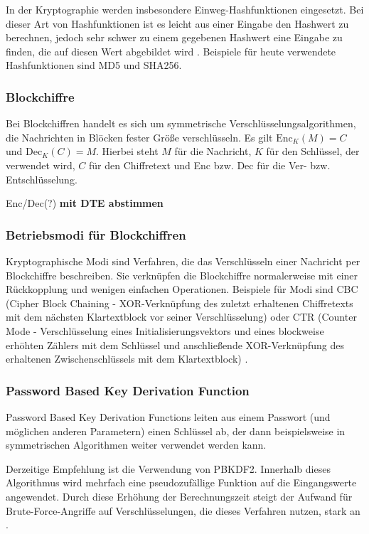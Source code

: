 In der Kryptographie werden insbesondere Einweg-Hashfunktionen eingesetzt. Bei dieser Art von Hashfunktionen ist es leicht aus einer Eingabe den Hashwert zu berechnen, jedoch sehr schwer zu einem gegebenen Hashwert eine Eingabe zu finden, die auf diesen Wert abgebildet wird \cite{Schneier2006}. Beispiele für heute verwendete Hashfunktionen sind MD5 und SHA256.

\subsubsection*{Blockchiffre}
Bei Blockchiffren handelt es sich um symmetrische Verschlüsselungsalgorithmen, die Nachrichten in Blöcken fester Größe verschlüsseln. Es gilt \(\text{Enc}_K(M)=C\) und \(\text{Dec}_K(C)=M\). Hierbei steht \(M\) für die Nachricht, \(K\) für den Schlüssel, der verwendet wird, \(C\) für den Chiffretext und Enc bzw. Dec für die Ver- bzw. Entschlüsselung\cite{Schneier2006}.

Enc/Dec(?) \textbf{mit DTE abstimmen}

\subsubsection*{Betriebsmodi für Blockchiffren}
Kryptographische Modi sind Verfahren, die das Verschlüsseln einer Nachricht per Blockchiffre beschreiben. Sie verknüpfen die Blockchiffre normalerweise mit einer Rückkopplung und wenigen einfachen Operationen. Beispiele für Modi sind CBC (Cipher Block Chaining - XOR-Verknüpfung des zuletzt erhaltenen Chiffretexts mit dem nächsten Klartextblock vor seiner Verschlüsselung) oder CTR (Counter Mode - Verschlüsselung eines Initialisierungsvektors und eines blockweise erhöhten Zählers mit dem Schlüssel und anschließende XOR-Verknüpfung des erhaltenen Zwischenschlüssels mit dem Klartextblock) \cite{Schneier2006}.

\subsubsection*{Password Based Key Derivation Function}
Password Based Key Derivation Functions leiten aus einem Passwort (und möglichen anderen Parametern) einen Schlüssel ab, der dann beispielsweise in symmetrischen Algorithmen weiter verwendet werden kann.

Derzeitige Empfehlung ist die Verwendung von PBKDF2. Innerhalb dieses Algorithmus wird mehrfach eine pseudozufällige Funktion auf die Eingangswerte angewendet. Durch diese Erhöhung der Berechnungszeit steigt der Aufwand für Brute-Force-Angriffe auf Verschlüsselungen, die dieses Verfahren nutzen, stark an  \cite{pbkdf2000}.

